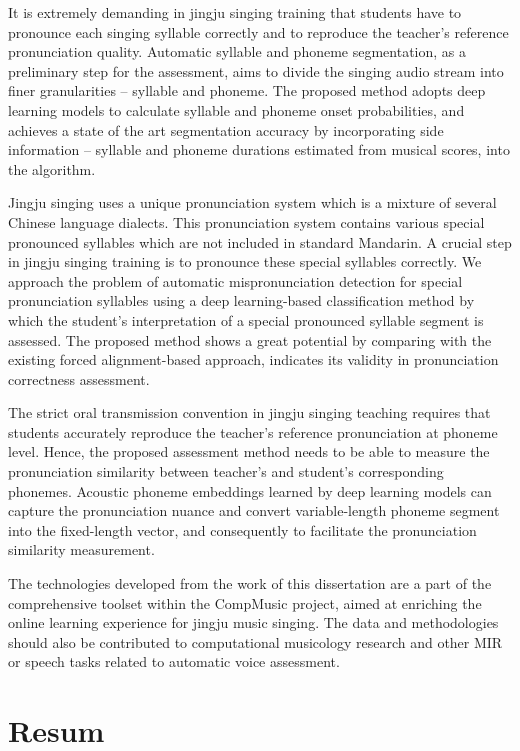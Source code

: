 It is extremely demanding in jingju singing training that students have to pronounce each singing syllable correctly and to reproduce the teacher's reference pronunciation quality. Automatic syllable and phoneme segmentation, as a preliminary step for the assessment, aims to divide the singing audio stream into finer granularities -- syllable and phoneme. The proposed method adopts deep learning models to calculate syllable and phoneme onset probabilities, and achieves a state of the art segmentation accuracy by incorporating side information -- syllable and phoneme durations estimated from musical scores, into the algorithm.

Jingju singing uses a unique pronunciation system which is a mixture of several Chinese language dialects. This pronunciation system contains various special pronounced syllables which are not included in standard Mandarin. A crucial step in jingju singing training is to pronounce these special syllables correctly. We approach the problem of automatic mispronunciation detection for special pronunciation syllables using a deep learning-based classification method by which the student's interpretation of a special pronounced syllable segment is assessed. The proposed method shows a great potential by comparing with the existing forced alignment-based approach, indicates its validity in pronunciation correctness assessment.

The strict oral transmission convention in jingju singing teaching requires that students accurately reproduce the teacher's reference pronunciation at phoneme level. Hence, the proposed assessment method needs to be able to measure the pronunciation similarity between teacher's and student's corresponding phonemes. Acoustic phoneme embeddings learned by deep learning models can capture the pronunciation nuance and convert variable-length phoneme segment into the fixed-length vector, and consequently to facilitate the pronunciation similarity measurement.

The technologies developed from the work of this dissertation are a part of the comprehensive toolset within the CompMusic project, aimed at enriching the online learning experience for jingju music singing. The data and methodologies should also be contributed to computational musicology research and other MIR or speech tasks related to automatic voice assessment.
\chapter{Resum}
\vspace*{-1cm}


